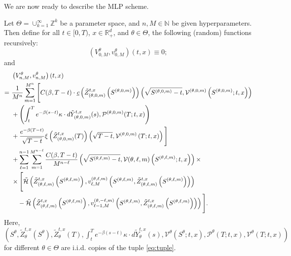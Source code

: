 \documentclass[11pt]{article}
\theoremstyle{definition}
\theoremstyle{plain}
\newcommand{\R}{\mathbb{R}}
\newcommand{\N}{\mathbb{N}}
\newcommand{\cH}{{\cal H}}
\newcommand{\Z}{\mathbb{Z}}
\begin{document}
We are now ready to describe the MLP scheme.

Let $\Theta = \cup_{k=1}^{\infty} \Z^k$ be a parameter space, 
and $n, M \in \N$ be given hyperparameters.
Then define for all $t \in [0, T)$, $x \in \R_+^d$, and $\theta \in \Theta$, 
the following (random) functions recursively:
\begin{equation}\label{eq:mlp-v0}
\left(V^\theta_{0,M}, v^\theta_{0,M}\right)(t,x)\equiv 0;
\end{equation}
and %
\begin{align}
& \left(V^\theta_{n,M}, v^\theta_{n,M}\right)(t,x) \\
=~& \frac{1}{M^n}\sum_{m=1}^{M^n} \Bigg[C(\beta, T-t) \cdot 
\underbar{\em c}\left(\tilde{Z}^{t,x}_{(\theta, 0, m)}\left(S^{(\theta,0,m)}\right)\right) \left(\sqrt{S^{(\theta,0,m)}-t}, \mathcal{V}^{(\theta,0,m)}\left(S^{(\theta, 0, m)}; t,x\right)\right) \label{eq:Fv0-1} \\
& + \left(\int_t^T e^{-\beta (s-t)}\kappa\cdot d\tilde Y^{t,x}_{(\theta, 0, m)}(s), \mathcal{P}^{(\theta, 0, m)}(T; t,x)\right) \\
& + \frac{e^{-\beta (T-t)}}{\sqrt{T-t}}\xi \left(\tilde{Z}^{t,x}_{(\theta, 0, m)}(T)\right)\left(\sqrt{T-t}, \mathcal{V}^{(\theta,0,m)}\left(T; t,x\right)\right) \Bigg] \label{eq:Fv0-2}\\
& + \sum_{\ell=1}^{n-1} \sum_{m=1}^{M^{n-\ell}} 
\frac{C(\beta, T-t)}{M^{n-\ell}} \left(\sqrt{S^{(\theta, \ell, m)}-t}, \mathcal{V}{(\theta,\ell,m)}\left(S^{(\theta, \ell, m)}; t,x\right)\right) \times \label{eq:Fvl-1} \\
& \times \Bigg[\tilde \cH \left(\tilde{Z}^{t,x}_{(\theta, \ell, m)}\left(S^{(\theta,\ell,m)}\right), v^{(\theta, \ell, m)}_{\ell, M}\left(S^{(\theta,\ell,m)}, \tilde{Z}^{t,x}_{(\theta, \ell, m)}\left(S^{(\theta,\ell,m)}\right)\right) \right) \label{eq:Fvl-2}\\
& ~~~- \tilde \cH \left(\tilde{Z}^{t,x}_{(\theta, \ell, m)}\left(S^{(\theta,\ell,m)}\right), v^{(\theta, -\ell, m)}_{\ell-1, M}\left(S^{(\theta,\ell,m)}, \tilde{Z}^{t,x}_{(\theta, \ell, m)}\left(S^{(\theta,\ell,m)}\right)\right) \right)\Bigg]. \label{eq:mlp-rec}
\end{align}
Here, $\left(S^\theta, \tilde{Z}^{t,x}_\theta(S^\theta), \tilde{Z}^{t,x}_\theta(T), \int_t^T e^{-\beta (s-t)}\kappa\cdot d\tilde Y^{t,x}_\theta(s), \mathcal{V}^\theta(S^\theta; t,x), \mathcal{P}^\theta(T; t,x), \mathcal{V}^\theta(T; t,x) \right)$ 
for different $\theta \in \Theta$ 
are i.i.d. copies of the tuple \eqref{eq:tuple}. 
\end{document}
